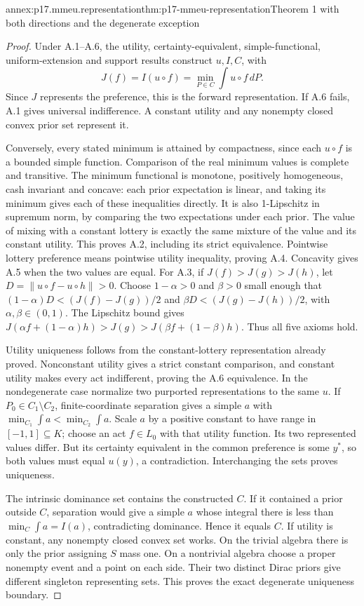 \begin{annexitem}{annex:p17.mmeu.representation}{thm:p17-mmeu-representation}{Theorem 1 with both directions and the degenerate exception}
\begin{proof}
Under A.1--A.6, the utility,
certainty-equivalent, simple-functional,
uniform-extension and support results
construct \(u,I,C\), with
\[
       J(f)=I(u\circ f)=\min_{P\in C}\int u\circ f\,dP.
\]
Since \(J\) represents the preference,
this is the forward representation.
If A.6 fails, A.1 gives universal
indifference. A constant utility and
any nonempty closed convex prior set
represent it.

Conversely, every stated minimum is
attained by compactness, since each
\(u\circ f\) is a bounded simple function.
Comparison of the real minimum values
is complete and transitive.
The minimum functional is monotone,
positively homogeneous, cash invariant
and concave: each prior expectation
is linear, and taking its minimum
gives each of these inequalities
directly. It is also 1-Lipschitz
in supremum norm, by comparing
the two expectations under each prior.
The value of mixing with a constant
lottery is exactly the same mixture
of the value and its constant utility.
This proves A.2, including its
strict equivalence. Pointwise lottery
preference means pointwise utility
inequality, proving A.4.
Concavity gives A.5 when the two
values are equal.
For A.3, if \(J(f)>J(g)>J(h)\),
let \(D=\|u\circ f-u\circ h\|>0\).
Choose \(1-\alpha>0\) and \(\beta>0\)
small enough that
\((1-\alpha)D<(J(f)-J(g))/2\)
and \(\beta D<(J(g)-J(h))/2\),
with \(\alpha,\beta\in(0,1)\).
The Lipschitz bound gives
\(J(\alpha f+(1-\alpha)h)>J(g)>
J(\beta f+(1-\beta)h)\).
Thus all five axioms hold.

Utility uniqueness follows from the
constant-lottery representation already
proved. Nonconstant utility gives a
strict constant comparison, and constant
utility makes every act indifferent,
proving the A.6 equivalence.
In the nondegenerate case normalize
two purported representations to
the same \(u\).
If \(P_0\in C_1\setminus C_2\),
finite-coordinate separation gives
a simple \(a\) with
\(\min_{C_1}\int a<\min_{C_2}\int a\).
Scale \(a\) by a positive constant
to have range in \([-1,1]\subseteq K\);
choose an act \(f\in L_0\) with
that utility function. Its two
represented values differ.
But its certainty equivalent in
the common preference is some \(y^*\),
so both values must equal \(u(y)\),
a contradiction. Interchanging the
sets proves uniqueness.

The intrinsic dominance set contains
the constructed \(C\). If it contained
a prior outside \(C\), separation
would give a simple \(a\) whose
integral there is less than
\(\min_C\int a=I(a)\), contradicting
dominance. Hence it equals \(C\).
If utility is constant, any nonempty
closed convex set works. On the
trivial algebra there is only the
prior assigning \(S\) mass one.
On a nontrivial algebra choose a
proper nonempty event and a point
on each side. Their two distinct
Dirac priors give different singleton
representing sets. This proves the
exact degenerate uniqueness boundary.
\end{proof}
\end{annexitem}

